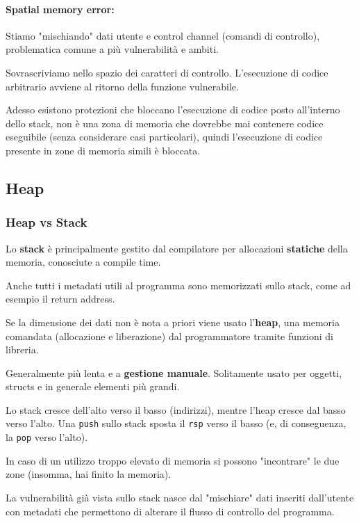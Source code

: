 \paragraph{Spatial memory error:} Stiamo "mischiando" dati utente e control channel (comandi di controllo), problematica comune a più vulnerabilità e ambiti. 

Sovrascriviamo nello spazio dei caratteri di controllo. L'esecuzione di codice arbitrario avviene al ritorno della funzione vulnerabile.

Adesso esistono protezioni che bloccano l'esecuzione di codice posto all'interno dello stack, non è una zona di memoria che dovrebbe mai contenere codice eseguibile (senza considerare casi particolari), quindi l'esecuzione di codice presente in zone di memoria simili è bloccata.


\subsection{Heap}

\subsubsection{Heap vs Stack}

Lo \textbf{stack} è principalmente gestito dal compilatore per allocazioni \textbf{statiche} della memoria, conosciute a compile time. 

Anche tutti i metadati utili al programma sono memorizzati sullo stack, come ad esempio il return address. 

Se la dimensione dei dati non è nota a priori viene usato l'\textbf{heap}, una memoria comandata (allocazione e liberazione) dal programmatore tramite funzioni di libreria. 

Generalmente più lenta e a \textbf{gestione manuale}. Solitamente usato per oggetti, structs e in generale elementi più grandi.

Lo stack cresce dell'alto verso il basso (indirizzi), mentre l'heap cresce dal basso verso l'alto. Una \texttt{push} sullo stack sposta il \texttt{rsp} verso il basso (e, di conseguenza, la \texttt{pop} verso l'alto). 

In caso di un utilizzo troppo elevato di memoria si possono "incontrare" le due zone (insomma, hai finito la memoria).

La vulnerabilità già vista sullo stack nasce dal "mischiare" dati inseriti dall'utente con metadati che permettono di alterare il flusso di controllo del programma.

